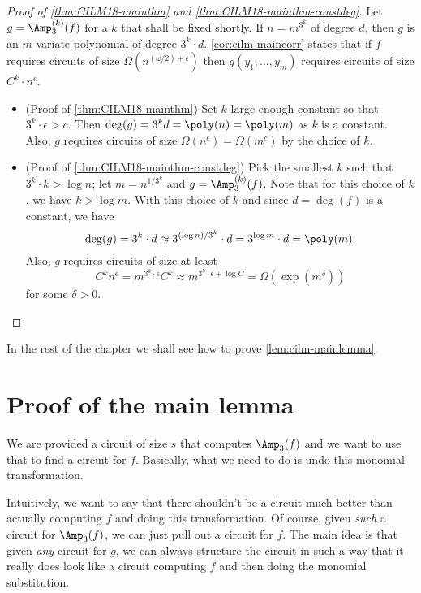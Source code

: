 \begin{proof}[Proof of \autoref{thm:CILM18-mainthm} and \autoref{thm:CILM18-mainthm-constdeg}]
  Let $g = \Amp_3^{(k)}(f)$ for a $k$ that shall be fixed shortly. If $n = m^{3^k}$ of degree $d$, then $g$ is an $m$-variate polynomial of degree $3^k \cdot d$. \autoref{cor:cilm-maincorr} states that if $f$ requires circuits of size $\Omega(n^{(\omega/2) + \epsilon})$ then $g(y_1,\ldots, y_m)$ requires circuits of size $C^k \cdot n^\epsilon$.

  \begin{itemize}
  \item (Proof of \autoref{thm:CILM18-mainthm}) Set $k$ large enough constant so that $3^k \cdot \epsilon > c$. Then $\deg(g) = 3^k d = \poly(n) = \poly(m)$ as $k$ is a constant. Also, $g$ requires circuits of size $\Omega(n^\epsilon) = \Omega(m^c)$ by the choice of $k$.

  \item (Proof of \autoref{thm:CILM18-mainthm-constdeg}) Pick the smallest $k$ such that $3^k \cdot k > \log n$; let $m = n^{1/3^k}$ and $g = \Amp_3^{(k)}(f)$.
Note that for this choice of $k$, we have $k > \log m$. 
    With this choice of $k$ and since $d = \deg(f)$ is a constant, we have
    \[
      \deg(g) = 3^k \cdot d \approx 3^{(\log n) / 3^k} \cdot d = 3^{\log m} \cdot d = \poly(m).
    \]
    Also, $g$ requires circuits of size at least
    \[
      C^k n^\epsilon = m^{3^k \cdot \epsilon} C^k \approx m^{3^k \cdot \epsilon + \log C}= \Omega(\exp(m^\delta))
    \]
    for some $\delta > 0$. \qedhere
  \end{itemize}
\end{proof}

\noindent
In the rest of the chapter we shall see how to prove \autoref{lem:cilm-mainlemma}.

\section{Proof of the main lemma}

We are provided a circuit of size $s$ that computes $\Amp_3(f)$ and we want to use that to find a circuit for $f$. Basically, what we need to do is undo this monomial transformation.

Intuitively, we want to say that there shouldn't be a circuit much better than actually computing $f$ and doing this transformation. Of course, given \emph{such} a circuit for $\Amp_3(f)$, we can just pull out a circuit for $f$. The main idea is that given \emph{any} circuit for $g$, we can always structure the circuit in such a way that it really does look like a circuit computing $f$ and then doing the monomial substitution.

